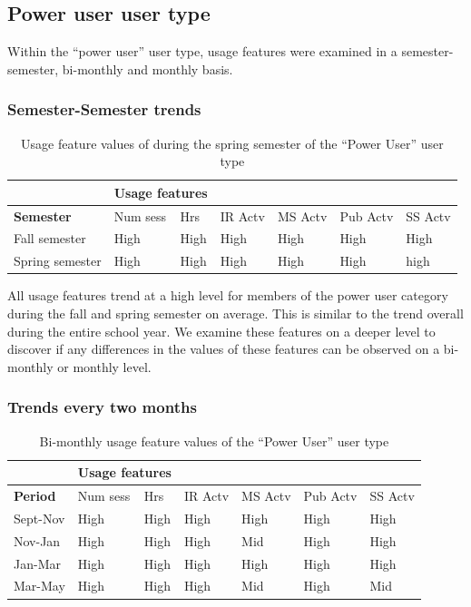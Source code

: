 \documentclass{acm_proc_article-sp}
\begin{document}
\subsection {Power user user type}
Within the ``power user'' user type, usage features were examined in a semester-semester, bi-monthly and monthly basis.

\subsubsection{Semester-Semester trends}

\begin{table}
\caption{Usage feature values of during the spring semester of the ``Power User'' user type}
\label{cluster1semester}
\begin{tabular}{|p{1.5cm}|p{0.6cm}|p{0.6cm}|p{0.6cm}|p{0.6cm}|p{0.8cm}|p{0.8cm}|}
& \multicolumn{2}{r}{\textbf{Usage features}}  \\ \hline
 \textbf{Semester} 
 & Num sess & Hrs & IR Actv & MS Actv & Pub Actv & SS Actv \\ \hline
Fall  semester & High & High  & High & High & High & High \\ \hline
Spring semester & High & High  & High & High & High & high \\ \hline
\end{tabular}
\end{table}

All usage features trend at a high level for members of the power user category during the fall and spring semester on average. This is similar to the trend overall during the entire school year. We examine these features on a deeper level to discover if any differences in the values of these features can be observed on a bi-monthly or monthly level.

\subsubsection{Trends every two months}
\begin{table}
\caption{Bi-monthly usage feature values of the ``Power User'' user type}
\label{cluster1bimonthly}
\begin{tabular}{|p{1.5cm}|p{0.6cm}|p{0.6cm}|p{0.6cm}|p{0.6cm}|p{0.8cm}|p{0.8cm}|}
& \multicolumn{2}{r}{\textbf{Usage features}}  \\ \hline
 \textbf{Period} 
 & Num sess & Hrs & IR Actv & MS Actv & Pub Actv & SS Actv \\ \hline
Sept-Nov & High & High  & High & High & High & High \\ \hline
Nov-Jan & High & High  & High & Mid & High & High \\ \hline
Jan-Mar & High & High  & High & High & High & High \\ \hline
Mar-May & High & High  & High & Mid & High & Mid \\ \hline
\end{tabular}
\end{table}
\end{document}
